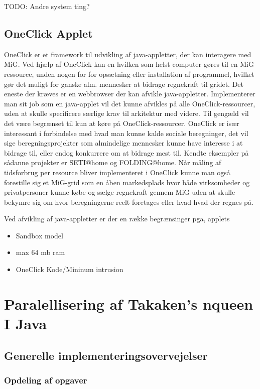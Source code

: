 \documentclass[draft,a4paper,10pt]{article}
\begin{document}
TODO: Andre system ting?

\subsection{OneClick Applet}\label{applet}

OneClick er et framework til udvikling af java-appletter, der kan interagere med MiG. Ved hjælp af OneClick kan en hvilken som helst computer gøres til en MiG-ressource, unden nogen for for opsætning eller installation af programmel, hvilket gør det muligt for ganske alm. mennesker at bidrage regnekraft til gridet. Det eneste der kræves er en webbrowser der kan afvikle java-appletter. Implementerer man sit job som en java-applet vil det kunne afvikles på alle OneClick-ressourcer, uden at skulle specificere særlige krav til arkitektur med videre. Til gengæld vil det være begrænset til kun at køre på OneClick-ressourcer. 
OneClick er især interessant i forbindelse med hvad man kunne kalde sociale beregninger, det vil sige beregningsprojekter som almindelige mennesker kunne have interesse i at bidrage til, eller endog konkurrere om at bidrage mest til. Kendte eksempler på sådanne projekter er SETI@home og FOLDING@home. Når måling af tidsforbrug per resource bliver implementeret i OneClick kunne man også  forestille sig et MiG-grid som en åben markedsplads hvor både virksomheder og privatpersoner kunne købe og sælge regnekraft gennem MiG uden at skulle bekymre sig om hvor beregningerne reelt foretages eller hvad hvad der regnes på.  

Ved afvikling af java-appletter er der en række begrænsinger pga, applets
\begin{itemize}
	
	\item Sandbox model
	\item max 64 mb ram
	\item OneClick Kode/Mininum intrusion
\end{itemize}

\section{Paralellisering af Takaken's nqueen I Java}

\subsection{Generelle implementeringsovervejelser}
\subsubsection{Opdeling af opgaver}
\end{document}
